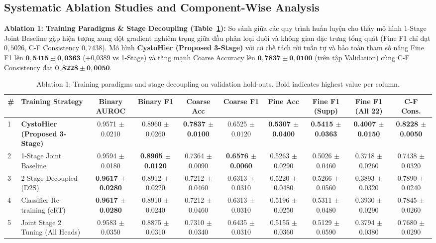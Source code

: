 \documentclass[runningheads]{llncs}
\begin{document}
\subsection{Systematic Ablation Studies and Component-Wise Analysis}
\label{sec:ablations}

\noindent \textbf{Ablation 1: Training Paradigms \& Stage Decoupling (Table~\ref{tab:ablation_training_paradigm}):} 
So sánh giữa các quy trình huấn luyện cho thấy mô hình 1-Stage Joint Baseline gặp hiện tượng xung đột gradient nghiêm trọng giữa đầu phân loại đuôi và không gian đặc trưng tổng quát (Fine F1 chỉ đạt $0{,}5026$, C-F Consistency $0{,}7438$). Mô hình \textbf{CystoHier (Proposed 3-Stage)} với cơ chế tách rời tuần tự và bảo toàn tham số nâng Fine F1 lên $\mathbf{0{,}5415 \pm 0{,}0363}$ (+0,0389 vs 1-Stage) và tăng mạnh Coarse Accuracy lên $\mathbf{0{,}7837 \pm 0{,}0100}$ (trên tập Validation) cùng C-F Consistency đạt $\mathbf{0{,}8228 \pm 0{,}0050}$.

\begin{table}[t]
\centering
\caption{Ablation 1: Training paradigms and stage decoupling on validation hold-outs. Bold indicates highest value per column.}
\label{tab:ablation_training_paradigm}
\begin{adjustbox}{max width=\textwidth}
\begin{tabular}{llcccccccc}
\toprule
\textbf{\#} & \textbf{Training Strategy} & \textbf{Binary AUROC} & \textbf{Binary F1} & \textbf{Coarse Acc} & \textbf{Coarse F1} & \textbf{Fine Acc} & \textbf{Fine F1 (Supp)} & \textbf{Fine F1 (All 22)} & \textbf{C-F Cons.} \\
\midrule
1 & \textbf{CystoHier (Proposed 3-Stage)} & 0.9571 $\pm$ 0.0210 & 0.8960 $\pm$ 0.0260 & \textbf{0.7837 $\pm$ 0.0100} & 0.6525 $\pm$ 0.0120 & \textbf{0.5307 $\pm$ 0.0400} & \textbf{0.5415 $\pm$ 0.0363} & \textbf{0.4007 $\pm$ 0.0150} & \textbf{0.8228 $\pm$ 0.0050} \\
2 & 1-Stage Joint Baseline & 0.9594 $\pm$ 0.0180 & \textbf{0.8965 $\pm$ 0.0120} & 0.7364 $\pm$ 0.0090 & \textbf{0.6576 $\pm$ 0.0060} & 0.5263 $\pm$ 0.0290 & 0.5026 $\pm$ 0.0460 & 0.3718 $\pm$ 0.0260 & 0.7438 $\pm$ 0.0320 \\
3 & 2-Stage Decoupled (D2S) & \textbf{0.9617 $\pm$ 0.0280} & 0.8912 $\pm$ 0.0220 & 0.7212 $\pm$ 0.0460 & 0.6313 $\pm$ 0.0310 & 0.5220 $\pm$ 0.0480 & 0.5266 $\pm$ 0.0560 & 0.3893 $\pm$ 0.0320 & 0.7890 $\pm$ 0.0240 \\
4 & Classifier Re-training (cRT) & \textbf{0.9617 $\pm$ 0.0280} & 0.8910 $\pm$ 0.0240 & 0.7212 $\pm$ 0.0460 & 0.6313 $\pm$ 0.0310 & 0.5196 $\pm$ 0.0250 & 0.5311 $\pm$ 0.0480 & 0.3930 $\pm$ 0.0290 & 0.7845 $\pm$ 0.0260 \\
5 & Joint Stage 2 Tuning (All Heads) & 0.9583 $\pm$ 0.0350 & 0.8875 $\pm$ 0.0310 & 0.7310 $\pm$ 0.0340 & 0.6435 $\pm$ 0.0310 & 0.5155 $\pm$ 0.0360 & 0.5129 $\pm$ 0.0590 & 0.3794 $\pm$ 0.0380 & 0.7680 $\pm$ 0.0290 \\
\bottomrule
\end{tabular}
\end{adjustbox}
\end{table}
\end{document}
